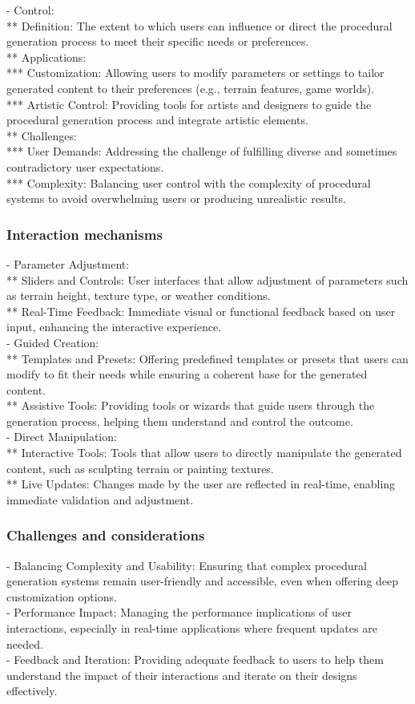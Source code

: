 - Control: \\
** Definition: The extent to which users can influence or direct the procedural generation process to meet their specific needs or preferences. \\
** Applications: \\
*** Customization: Allowing users to modify parameters or settings to tailor generated content to their preferences (e.g., terrain features, game worlds). \\
*** Artistic Control: Providing tools for artists and designers to guide the procedural generation process and integrate artistic elements. \\
** Challenges: \\
*** User Demands: Addressing the challenge of fulfilling diverse and sometimes contradictory user expectations. \\
*** Complexity: Balancing user control with the complexity of procedural systems to avoid overwhelming users or producing unrealistic results. 

\subsubsection{Interaction mechanisms}
- Parameter Adjustment: \\
** Sliders and Controls: User interfaces that allow adjustment of parameters such as terrain height, texture type, or weather conditions. \\
** Real-Time Feedback: Immediate visual or functional feedback based on user input, enhancing the interactive experience. \\
- Guided Creation: \\
** Templates and Presets: Offering predefined templates or presets that users can modify to fit their needs while ensuring a coherent base for the generated content. \\
** Assistive Tools: Providing tools or wizards that guide users through the generation process, helping them understand and control the outcome. \\
- Direct Manipulation: \\
** Interactive Tools: Tools that allow users to directly manipulate the generated content, such as sculpting terrain or painting textures. \\
** Live Updates: Changes made by the user are reflected in real-time, enabling immediate validation and adjustment. \\
\subsubsection{Challenges and considerations}
- Balancing Complexity and Usability: Ensuring that complex procedural generation systems remain user-friendly and accessible, even when offering deep customization options. \\
- Performance Impact: Managing the performance implications of user interactions, especially in real-time applications where frequent updates are needed. \\
- Feedback and Iteration: Providing adequate feedback to users to help them understand the impact of their interactions and iterate on their designs effectively.

